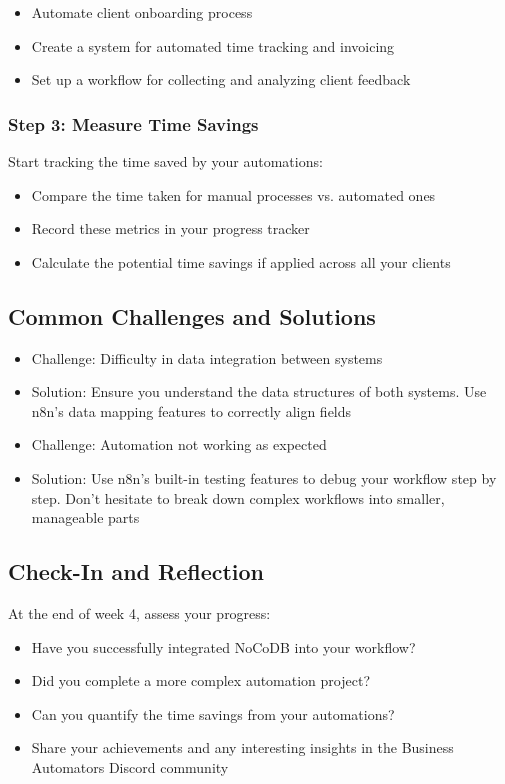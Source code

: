\begin{itemize}
    \item Automate client onboarding process
    \item Create a system for automated time tracking and invoicing
    \item Set up a workflow for collecting and analyzing client feedback
\end{itemize}

\subsubsection{Step 3: Measure Time Savings}
Start tracking the time saved by your automations:

\begin{itemize}
    \item Compare the time taken for manual processes vs. automated ones
    \item Record these metrics in your progress tracker
    \item Calculate the potential time savings if applied across all your clients
\end{itemize}

\subsection{Common Challenges and Solutions}
\begin{itemize}
    \item Challenge: Difficulty in data integration between systems
    \item Solution: Ensure you understand the data structures of both systems. Use n8n's data mapping features to correctly align fields

    \item Challenge: Automation not working as expected
    \item Solution: Use n8n's built-in testing features to debug your workflow step by step. Don't hesitate to break down complex workflows into smaller, manageable parts
\end{itemize}

\subsection{Check-In and Reflection}
At the end of week 4, assess your progress:

\begin{itemize}
    \item Have you successfully integrated NoCoDB into your workflow?
    \item Did you complete a more complex automation project?
    \item Can you quantify the time savings from your automations?
    \item Share your achievements and any interesting insights in the Business Automators Discord community
\end{itemize}

